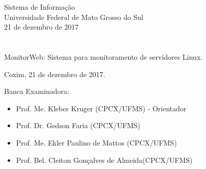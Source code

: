 \vskip 0.5cm
\begin{center}
Sistema de Informação\\
Universidade Federal de Mato Grosso do Sul\\
21 de dezembro de 2017
\end{center}
		

\chapter*{}

\begin{center}

\begin{minipage}[t]{10cm}
	\begin{center}
		\vspace{-2cm}
		{{\Large MonitorWeb: Sistema para monitoramento de servidores Linux.}} 
	\end{center}
\end{minipage}

\end{center}


\begin{flushright}
	\vspace{12cm}
	Coxim, 21 de dezembro de 2017.
	
\end{flushright}

\vspace{2cm}
Banca Examinadora:

\begin{itemize}
	\item Prof. Me.  Kleber Kruger (CPCX/UFMS) - Orientador
	\item Prof. Dr.  Gedson Faria (CPCX/UFMS)
	\item Prof. Me.  Ekler Paulino de Mattos (CPCX/UFMS)
	\item Prof. Bel. Cleiton Gonçalves de Almeida(CPCX/UFMS)
    
\end{itemize}
